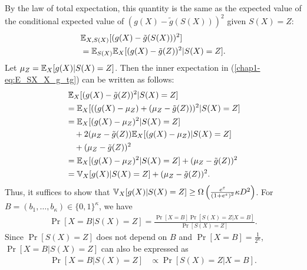 {%
By the law of total expectation, this quantity is the same as the expected value of the conditional expected value of $(g(X)- \tilde{g}(S(X)))^2$ given 
$S(X) = Z$:
\begin{align}
  &\mathbb{E}_{X, S(X)}[(g(X)- \tilde{g}(S(X)))^2] \nonumber\\
  &= \mathbb{E}_{S(X)} \mathbb{E}_X[(g(X) - \tilde{g}(Z) )^2 | S(X)=Z].
  \label{chap1-eq:E_SX_X_g_tg}
\end{align}
Let $\mu_Z = \mathbb{E}_X[g(X)|S(X)=Z]$. 
Then the inner expectation in (\ref{chap1-eq:E_SX_X_g_tg}) can be written as follows:
\begin{align*}
  &\; \mathbb{E}_X[(g(X) - \tilde{g}(Z) )^2 | S(X)=Z] \\
  &= \mathbb{E}_X[( (g(X) - \mu_Z) + (\mu_Z - \tilde{g}(Z)) )^2 | S(X)=Z] \\
  &= \mathbb{E}_X[(g(X) - \mu_Z)^2 |S(X)=Z] \\
  &\hspace{3.5mm}+ 2(\mu_Z - \tilde{g}(Z))\mathbb{E}_X[(g(X) - \mu_Z)|S(X)=Z] \\
  &\hspace{3.5mm}+ (\mu_Z - \tilde{g}(Z))^2 \\
  &= \mathbb{E}_X[(g(X) - \mu_Z)^2 |S(X)=Z] + (\mu_Z - \tilde{g}(Z))^2 \\
  &= \mathbb{V}_X[g(X)|S(X)=Z] + (\mu_Z - \tilde{g}(Z))^2.
\end{align*}
Thus, it suffices to show that $\mathbb{V}_X[g(X)|S(X)=Z] \geq
\Omega\left(\frac{e^\varepsilon}{(1+e^\varepsilon)^2} \kappa D^2 \right)$.
For $B = (b_1, \ldots, b_\kappa) \in \{0,1\}^\kappa$, we have
\begin{align*}
  \Pr[X=B|S(X)=Z] = \frac{\Pr[X=B]\Pr[S(X)=Z|X=B]}{\Pr[S(X)=Z]}.
\end{align*}
Since $\Pr[S(X)=Z]$ does not depend on $B$ and
$\Pr[X=B] = \frac{1}{2^\kappa}$, $\Pr[X=B|S(X)=Z]$ can also be expressed as 
\begin{align}
  \Pr[X=B|S(X)=Z] &\propto \Pr[S(X)=Z|X=B].
  \label{chap1-eq:X_B_SX_Z_propto}
\end{align}
}
